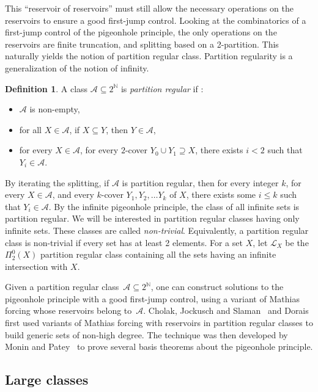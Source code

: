 \documentclass{article}
\def\NN{\mathbb{N}}
\def\A{\mathcal{A}}
\renewcommand{\L}[0]{\mathcal{L}}
\newcommand{\cs}{2^{\NN}}
\def\qt#1{``#1''}%
\numberwithin{theorem}{section}
\theoremstyle{definition}
\newtheorem{definition}[theorem]{Definition}
\begin{document}
This \qt{reservoir of reservoirs} must still allow the necessary operations on the reservoirs to ensure a good first-jump control. Looking at the combinatorics of a first-jump control of the pigeonhole principle, the only operations on the reservoirs are finite truncation, and splitting based on a 2-partition. This naturally yields the notion of partition regular class.
Partition regularity is a generalization of the notion of infinity.

\begin{definition}
A class $\A \subseteq 2^{\NN}$ is \textit{partition regular} if :
\begin{itemize}
    \item $\A$ is non-empty,
    \item for all $X \in \A$, if $ X \subseteq Y$, then $Y \in \A$,
    \item for every $X \in \A$, for every $2$-cover $Y_0 \cup Y_1 \supseteq X$, there exists $i < 2$ such that $Y_i \in \A$.
\end{itemize}
\end{definition}

By iterating the splitting, if $\A$ is partition regular, then for every integer $k$, for every $X \in \A$, and every $k$-cover $Y_1, Y_2, \dots Y_k$ of $X$, there exists some $i \leq k$ such that $Y_i \in \A$.
By the infinite pigeonhole principle, the class of all infinite sets is partition regular. We will be interested in partition regular classes having only infinite sets. These classes are called \emph{non-trivial}. Equivalently, a partition regular class is non-trivial if every set has at least 2 elements.
For a set $X$, let $\L_X$ be the $\Pi_2^0(X)$ partition regular class containing all the sets having an infinite intersection with $X$. 

Given a partition regular class~$\A \subseteq \cs$, one can construct solutions to the pigeonhole principle with a good first-jump control, using a variant of Mathias forcing whose reservoirs belong to~$\A$. Cholak, Jockusch and Slaman~\cite{cholak2001strength} and Dorais~\cite{dorais2012variant} first used variants of Mathias forcing with reservoirs in partition regular classes to build generic sets of non-high degree. The technique was then developed by Monin and Patey~\cite{monin201pigeons,monin2021weakness,monin2021srt,monin2022partition} to prove several basis theorems about the pigeonhole principle.

\subsection{Large classes}
\end{document}
